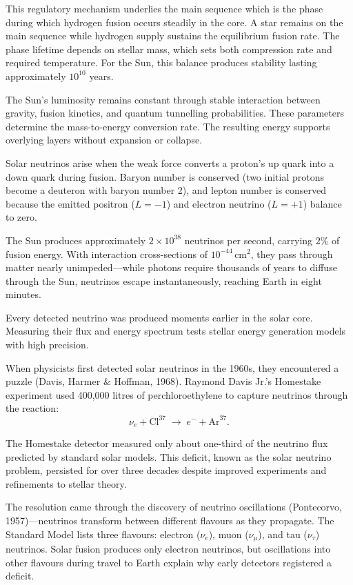 This regulatory mechanism underlies the main sequence which is the phase during which hydrogen fusion occurs steadily in the core. A star remains on the main sequence while hydrogen supply sustains the equilibrium fusion rate. The phase lifetime depends on stellar mass, which sets both compression rate and required temperature. For the Sun, this balance produces stability lasting approximately $10^{10}$ years.

The Sun's luminosity remains constant through stable interaction between gravity, fusion kinetics, and quantum tunnelling probabilities. These parameters determine the mass-to-energy conversion rate. The resulting energy supports overlying layers without expansion or collapse.

Solar neutrinos arise when the weak force converts a proton's up quark into a down quark during fusion. Baryon number is conserved (two initial protons become a deuteron with baryon number 2), and lepton number is conserved because the emitted positron ($L=-1$) and electron neutrino ($L=+1$) balance to zero.

The Sun produces approximately $2 \times 10^{38}$ neutrinos per second, carrying $2\%$ of fusion energy. With interaction cross-sections of $10^{-44}\,\text{cm}^2$, they pass through matter nearly unimpeded—while photons require thousands of years to diffuse through the Sun, neutrinos escape instantaneously, reaching Earth in eight minutes.

Every detected neutrino was produced moments earlier in the solar core. Measuring their flux and energy spectrum tests stellar energy generation models with high precision.

When physicists first detected solar neutrinos in the 1960s, they encountered a puzzle (Davis, Harmer \& Hoffman, 1968). Raymond Davis Jr.'s Homestake experiment used 400,000 litres of perchloroethylene to capture neutrinos through the reaction:
\[
\nu_e + \text{Cl}^{37} \;\to\; e^- + \text{Ar}^{37}.
\]

The Homestake detector measured only about one-third of the neutrino flux predicted by standard solar models. This deficit, known as the solar neutrino problem, persisted for over three decades despite improved experiments and refinements to stellar theory.

The resolution came through the discovery of neutrino oscillations (Pontecorvo, 1957)—neutrinos transform between different flavours as they propagate. The Standard Model lists three flavours: electron ($\nu_e$), muon ($\nu_\mu$), and tau ($\nu_\tau$) neutrinos. Solar fusion produces only electron neutrinos, but oscillations into other flavours during travel to Earth explain why early detectors registered a deficit.


